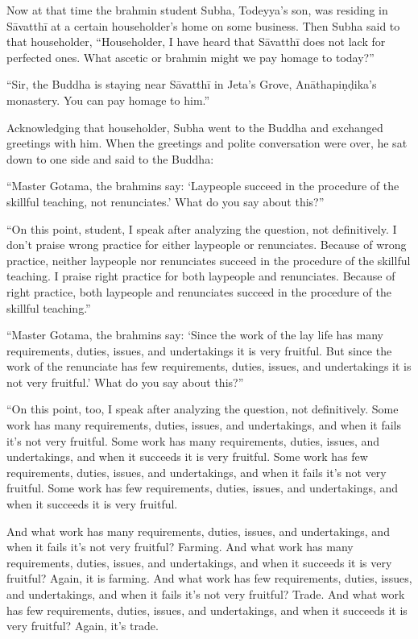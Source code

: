 \documentclass[12pt,openany]{book}%
\begin{document}
Now at that time the brahmin student Subha, Todeyya’s son, was residing in \textsanskrit{Sāvatthī} at a certain householder’s home on some business. Then Subha said to that householder, “Householder, I have heard that \textsanskrit{Sāvatthī} does not lack for perfected ones. What ascetic or brahmin might we pay homage to today?” 

“Sir, the Buddha is staying near \textsanskrit{Sāvatthī} in Jeta’s Grove, \textsanskrit{Anāthapiṇḍika}’s monastery. You can pay homage to him.” 

Acknowledging that householder, Subha went to the Buddha and exchanged greetings with him. When the greetings and polite conversation were over, he sat down to one side and said to the Buddha: 

“Master Gotama, the brahmins say: ‘Laypeople succeed in the procedure of the skillful teaching, not renunciates.’ What do you say about this?” 

“On this point, student, I speak after analyzing the question, not definitively. I don’t praise wrong practice for either laypeople or renunciates. Because of wrong practice, neither laypeople nor renunciates succeed in the procedure of the skillful teaching. I praise right practice for both laypeople and renunciates. Because of right practice, both laypeople and renunciates succeed in the procedure of the skillful teaching.” 

“Master Gotama, the brahmins say: ‘Since the work of the lay life has many requirements, duties, issues, and undertakings it is very fruitful. But since the work of the renunciate has few requirements, duties, issues, and undertakings it is not very fruitful.’ What do you say about this?” 

“On this point, too, I speak after analyzing the question, not definitively. Some work has many requirements, duties, issues, and undertakings, and when it fails it’s not very fruitful. Some work has many requirements, duties, issues, and undertakings, and when it succeeds it is very fruitful. Some work has few requirements, duties, issues, and undertakings, and when it fails it’s not very fruitful. Some work has few requirements, duties, issues, and undertakings, and when it succeeds it is very fruitful. 

And what work has many requirements, duties, issues, and undertakings, and when it fails it’s not very fruitful? Farming. And what work has many requirements, duties, issues, and undertakings, and when it succeeds it is very fruitful? Again, it is farming. And what work has few requirements, duties, issues, and undertakings, and when it fails it’s not very fruitful? Trade. And what work has few requirements, duties, issues, and undertakings, and when it succeeds it is very fruitful? Again, it’s trade. 
\end{document}
